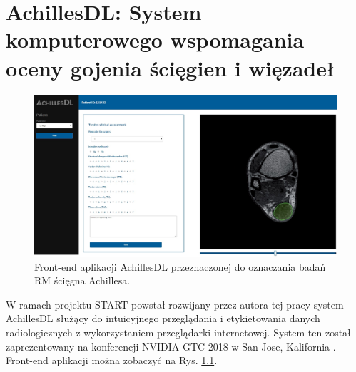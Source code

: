



\chapter{AchillesDL: System komputerowego wspomagania oceny gojenia ścięgien i więzadeł}
\label{app:AchillesDL}
\begin{figure}[H]
	\centering
	\includegraphics[width=1\textwidth]{figures/achillesDL.jpg}
	\caption{Front-end aplikacji AchillesDL przeznaczonej do oznaczania badań RM ścięgna Achillesa.}\label{fig:achillesDL}
\end{figure}
W ramach projektu START powstał rozwijany przez autora tej pracy system AchillesDL służący do intuicyjnego przeglądania i etykietowania danych radiologicznych z wykorzystaniem przeglądarki internetowej. System ten został zaprezentowany na konferencji NVIDIA GTC 2018 w San Jose, Kalifornia \cite{KapinskiGTC2018}. Front-end aplikacji można zobaczyć na Rys. \ref{fig:achillesDL}.


